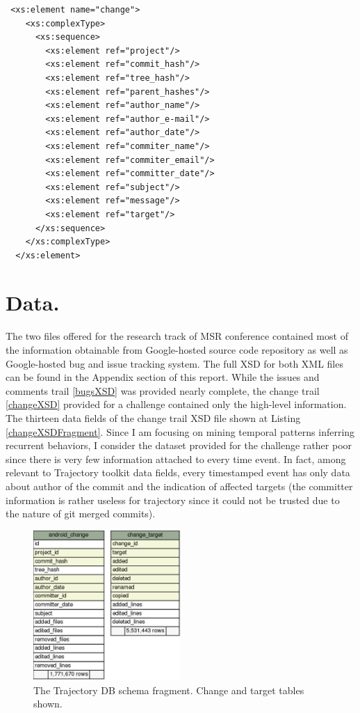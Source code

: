 \documentclass[a4paper,10pt]{article}
\numberwithin{equation}{subsection}
\begin{document}
\lstset{label=changeXSDFragment,caption=List of metadata provided by change trail XML (fragment) }
\begin{lstlisting}
 <xs:element name="change">
    <xs:complexType>
      <xs:sequence>
        <xs:element ref="project"/>
        <xs:element ref="commit_hash"/>
        <xs:element ref="tree_hash"/>
        <xs:element ref="parent_hashes"/>
        <xs:element ref="author_name"/>
        <xs:element ref="author_e-mail"/>
        <xs:element ref="author_date"/>
        <xs:element ref="commiter_name"/>
        <xs:element ref="commiter_email"/>
        <xs:element ref="committer_date"/>
        <xs:element ref="subject"/>
        <xs:element ref="message"/>
        <xs:element ref="target"/>
      </xs:sequence>
    </xs:complexType>
  </xs:element>
\end{lstlisting}

\section{Data.}
The two files offered for the research track of MSR conference contained most of the information
obtainable from Google-hosted source code repository as well as Google-hosted bug and issue
tracking system. The full XSD for both XML files can be found in the Appendix section of this report.
While the issues and comments trail \ref{bugsXSD} was provided nearly complete,
the change trail \ref{changeXSD} provided for a challenge contained only the high-level information.
The thirteen data fields of the change trail XSD file shown at Listing \ref{changeXSDFragment}. 
Since I am focusing on mining temporal patterns inferring recurrent behaviors, I consider the dataset 
provided for the challenge rather poor since there is very few information attached to every 
time event. In fact, among relevant to Trajectory toolkit data fields, every timestamped event has 
only data about author of the commit and the indication of affected targets (the committer information
is rather useless for trajectory since it could not be trusted due to the nature of git merged commits).   

\begin{figure}
   \begin{center}
   \includegraphics[scale=0.4,width=0.5\textwidth]{schema-change-fragment}
   \end{center}
   \caption{The Trajectory DB schema fragment. Change and target tables shown.}
   \label{fig:android_downloads}
\end{figure}
\end{document}
